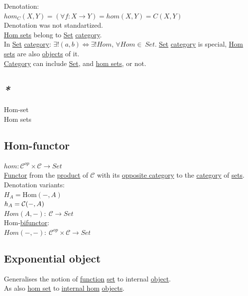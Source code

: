 \documentclass[a4paper,14pt,oneside]{book}
\begin{document}
Denotation:\\
\(hom_{C}(X,Y) = (\forall f: X \to Y) = hom(X,Y) = C(X,Y)\)\\
Denotation was not standartized.\\

\hyperref[orgff689e2]{Hom sets} belong to \hyperref[orge119629]{Set} \hyperref[org841d8bc]{category}.\\

In \hyperref[orge119629]{Set} \hyperref[org841d8bc]{category}: \(\exists! (a, b) \iff \exists! Hom\), \(\forall Hom \in \ Set\). \hyperref[orge119629]{Set} \hyperref[org841d8bc]{category} is special, \hyperref[orgff689e2]{Hom sets} are also \hyperref[org22f7883]{objects} of it.\\

\hyperref[org841d8bc]{Category} can include \hyperref[orge119629]{Set}, and \hyperref[orgff689e2]{hom sets}, or not.\\

\subsection{\emph{*}}
\label{sec:org65f8743}
\label{orgb461d72}Hom-set\\
\label{orgff689e2}Hom sets\\

\subsection{\label{org2ca3ad5}Hom-functor}
\label{sec:org5fb8e40}
\(hom:\mathcal{C}^{op} \times \mathcal{C} \to Set\)\\
\hyperref[orge5e236e]{Functor} from the \hyperref[org7331b6a]{product} of \(\mathcal{C}\) with its \hyperref[org0641959]{opposite category} to the \hyperref[org841d8bc]{category} of \hyperref[org1faae0f]{sets}.\\

Denotation variants:\\
\(H_A = \mathrm{Hom}(-, A)\)\\
\(h_A = {\cal \mathcal{C}}(-, A)\)\\
\(Hom(A,-): \ \mathcal{C} \to Set\)\\

Hom-\hyperref[org952346f]{bifunctor}:\\
\(Hom(-,-): \ \mathcal{C}^{op} \times \mathcal{C} \to Set\)\\

\subsection{\label{orgce87d4b}Exponential object}
\label{sec:org7a3c62f}
Generalises the notion of \hyperref[org8cc2ae4]{function} \hyperref[orge119629]{set} to internal \hyperref[org5771609]{object}.\\
As also \hyperref[org379dfc8]{hom set} to \hyperref[orgfaa5a1a]{internal hom} \hyperref[org22f7883]{objects}.\\
\end{document}
